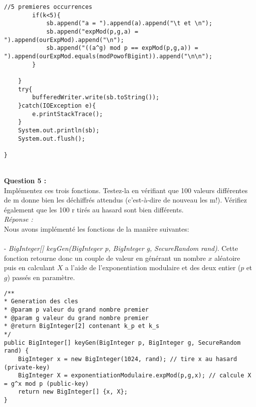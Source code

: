 \documentclass[a4paper,11pt]{article}
\begin{document}
\begin{lstlisting}[caption={testExpMod}, captionpos=b,breaklines = true]
        //5 premieres occurrences
        if(k<5){
            sb.append("a = ").append(a).append("\t et \n");
            sb.append("expMod(p,g,a) = ").append(ourExpMod).append("\n");
            sb.append("((a^g) mod p == expMod(p,g,a)) = ").append(ourExpMod.equals(modPowofBigint)).append("\n\n");
        }

    }
    try{
        bufferedWriter.write(sb.toString());
    }catch(IOException e){
        e.printStackTrace();
    }
    System.out.println(sb);
    System.out.flush();

}\end{lstlisting}

    \textbf{\\Question 5 : \\}Implémentez ces trois fonctions. Testez-la en vérifiant que 100 valeurs différentes de m donne bien les déchiffrés attendus (c’est-à-dire de nouveau les m!). Vérifiez également que les 100 r tirés au hasard sont bien différents.
    \textit{\\Réponse :}\\Nous avons implémenté les fonctions de la manière suivantes: \\\\ - \textit{BigInteger[] keyGen(BigInteger p, BigInteger g, SecureRandom rand)}. Cette fonction retourne donc un couple de valeur en générant un nombre $x$ aléatoire puis en calculant $X$ a l'aide de l'exponentiation modulaire et des deux entier ($p$ et $g$) passés en paramètre.
    \\\begin{lstlisting}[caption=keyGen, captionpos=b,breaklines = true]
/**
* Generation des cles
* @param p valeur du grand nombre premier
* @param g valeur du grand nombre premier
* @return BigInteger[2] contenant k_p et k_s
*/
public BigInteger[] keyGen(BigInteger p, BigInteger g, SecureRandom rand) {
    BigInteger x = new BigInteger(1024, rand); // tire x au hasard (private-key)
    BigInteger X = exponentiationModulaire.expMod(p,g,x); // calcule X = g^x mod p (public-key)
    return new BigInteger[] {x, X};
}
    \end{lstlisting}
\end{document}
